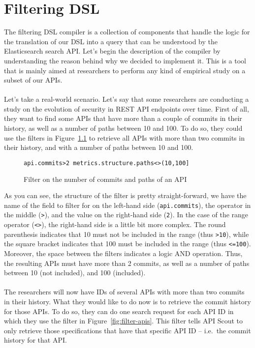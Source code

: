 \chapter{Filtering DSL}\label{ch:filtering-dsl}
The filtering DSL compiler is a collection of components that handle the logic for the translation of our DSL into a query that can be understood by the Elasticsearch search API\@.
Let's begin the description of the compiler by understanding the reason behind why we decided to implement it.
This is a tool that is mainly aimed at researchers to perform any kind of empirical study on a subset of our APIs. \\ \\
Let's take a real-world scenario.
Let's say that some researchers are conducting a study on the evolution of security in REST API endpoints over time.
First of all, they want to find some APIs that have more than a couple of commits in their history, as well as a number of paths between 10 and 100.
To do so, they could use the filters in Figure~\ref{fig:filter-commits} to retrieve all APIs with more than two commits in their history, and with a number of paths between 10 and 100.

\begin{figure}[!h]
    \begin{center}
        \verb|api.commits>2 metrics.structure.paths<>(10,100]|
    \end{center}

    \caption{Filter on the number of commits and paths of an API}
    \label{fig:filter-commits}
\end{figure}

\noindent As you can see, the structure of the filter is pretty straight-forward, we have the name of the field to filter for on the left-hand side (\verb|api.commits|), the operator in the middle (\verb|>|), and the value on the right-hand side (\verb|2|).
In the case of the range operator (\verb|<>|), the right-hand side is a little bit more complex.
The round parenthesis indicates that 10 must not be included in the range (thus \verb|>10|), while the square bracket indicates that 100 must be included in the range (thus \verb|<=100|).
Moreover, the space between the filters indicates a logic AND operation.
Thus, the resulting APIs must have more than 2 commits, as well as a number of paths between 10 (not included), and 100 (included). \\ \\
The researchers will now have IDs of several APIs with more than two commits in their history.
What they would like to do now is to retrieve the commit history for those APIs.
To do so, they can do one search request for each API ID in which they use the filter in Figure~\ref{fig:filter-apis}.
This filter tells API Scout to only retrieve those specifications that have that specific API ID -- i.e.\ the commit history for that API\@.

